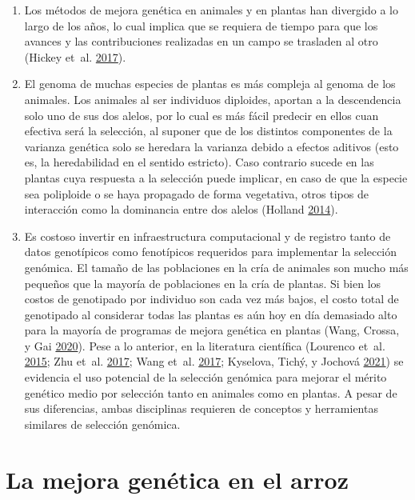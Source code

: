 \documentclass[11pt,spanish,a4paper,oneside,]{book} %
\begin{document}
\begin{enumerate}
\def\labelenumi{\arabic{enumi}.}
\item
  Los métodos de mejora genética en animales y en plantas han divergido a lo largo de los años, lo cual implica que se requiera de tiempo para que los avances y las contribuciones realizadas en un campo se trasladen al otro (Hickey et~al. \protect\hyperlink{ref-cite:44}{2017}).
\item
  El genoma de muchas especies de plantas es más compleja al genoma de los animales. Los animales al ser individuos diploides, aportan a la descendencia solo uno de sus dos alelos, por lo cual es más fácil predecir en ellos cuan efectiva será la selección, al suponer que de los distintos componentes de la varianza genética solo se heredara la varianza debido a efectos aditivos (esto es, la heredabilidad en el sentido estricto). Caso contrario sucede en las plantas cuya respuesta a la selección puede implicar, en caso de que la especie sea poliploide o se haya propagado de forma vegetativa, otros tipos de interacción como la dominancia entre dos alelos (Holland \protect\hyperlink{ref-cite:43}{2014}).
\item
  Es costoso invertir en infraestructura computacional y de registro tanto de datos genotípicos como fenotípicos requeridos para implementar la selección genómica. El tamaño de las poblaciones en la cría de animales son mucho más pequeños que la mayoría de poblaciones en la cría de plantas. Si bien los costos de genotipado por individuo son cada vez más bajos, el costo total de genotipado al considerar todas las plantas es aún hoy en día demasiado alto para la mayoría de programas de mejora genética en plantas (Wang, Crossa, y Gai \protect\hyperlink{ref-cite:46}{2020}).
  Pese a lo anterior, en la literatura científica (Lourenco et~al. \protect\hyperlink{ref-cite:87}{2015}; Zhu et~al. \protect\hyperlink{ref-cite:83}{2017}; Wang et~al. \protect\hyperlink{ref-cite:82}{2017}; Kyselova, Tichý, y Jochová \protect\hyperlink{ref-cite:32}{2021}) se evidencia el uso potencial de la selección genómica para mejorar el mérito genético medio por selección tanto en animales como en plantas. A pesar de sus diferencias, ambas disciplinas requieren de conceptos y herramientas similares de selección genómica.
\end{enumerate}

\hypertarget{la-mejora-genuxe9tica-en-el-arroz}{%
\section{La mejora genética en el arroz}\label{la-mejora-genuxe9tica-en-el-arroz}}
\end{document}
